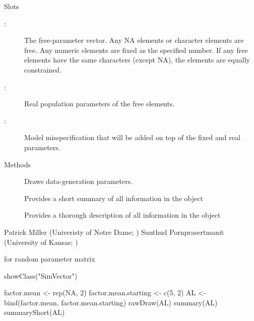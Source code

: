 \documentclass[a4paper]{book}
\begin{document}
\begin{Section}{Slots}
\begin{description}

\item[:] The free-parameter vector. Any NA elements or character elements are free. Any numeric elements are fixed as the specified number. If any free elements have the same characters (except NA), the elements are equally constrained.
\item[:] Real population parameters of the free elements.
\item[:] Model misspecification that will be added on top of the fixed and real parameters.

\end{description}

\end{Section}
%
\begin{Section}{Methods}
\begin{description}

\item[] Draws data-generation parameters.
\item[] Provides a short summary of all information in the object 
\item[] Provides a thorough description of all information in the object 


\end{description}

\end{Section}
%
\begin{Author}\relax
Patrick Miller (Univeristy of Notre Dame; )
Sunthud Pornprasertmanit (University of Kansas; )
\end{Author}
%
\begin{SeeAlso}\relax
{} for random parameter matrix 
\end{SeeAlso}
%
\begin{Examples}
\begin{ExampleCode}
showClass("SimVector")

factor.mean <- rep(NA, 2)
factor.mean.starting <- c(5, 2)
AL <- bind(factor.mean, factor.mean.starting)
rawDraw(AL)
summary(AL)
summaryShort(AL)
\end{ExampleCode}
\end{Examples}
\end{document}
